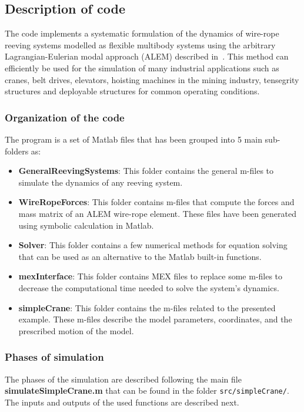 \subsection{Description of code}

The code implements a systematic formulation of the dynamics of wire-rope reeving systems modelled as flexible multibody systems using the arbitrary Lagrangian-Eulerian modal approach (ALEM) described in~\cite{Escalona2022}. This method can efficiently be used for the simulation of many industrial applications such as cranes, belt drives, elevators, hoisting machines in the mining industry, tensegrity structures and deployable structures for common operating conditions.

\subsubsection{Organization of the code}

The program is a set of Matlab files that has been grouped into 5 main sub-folders as:
\begin{itemize}
\item{\textbf{GeneralReevingSystems}: This folder contains the general m-files to simulate the dynamics of any reeving system.}
\item{\textbf{WireRopeForces}: This folder contains m-files that compute the forces and mass matrix of an ALEM  wire-rope element. These files have been generated using symbolic calculation in Matlab.}
\item{\textbf{Solver}: This folder contains a few numerical methods for equation solving that can be used as an alternative to the Matlab built-in functions.}
\item{\textbf{mexInterface}: This folder contains MEX files to replace some m-files to decrease the computational time needed to solve the system's dynamics.}
\item{\textbf{simpleCrane}: This folder contains the m-files related to the presented example. These m-files describe the model parameters, coordinates, and the prescribed motion of the model. }
\end{itemize}

\subsubsection{Phases of simulation}

The phases of the simulation are described following the main file \textbf{simulateSimpleCrane.m} that can be found in the folder \texttt{src/simpleCrane/}. The inputs and outputs of the used functions are described next. \\

